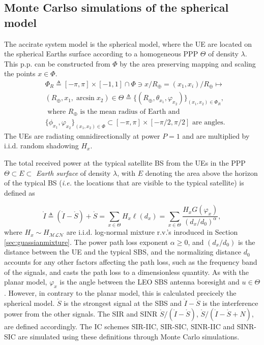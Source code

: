 \documentclass[lettersize,journal]{IEEEtran}
\newcommand{\rEarth}{R_{\oplus}}
\begin{document}
\subsection{Monte Carlso simulations of the spherical model}
\label{sec:sphericalmodel}
The accirate system model is the spherical model, where the UE are located on the spherical Earths surface according to a homogeneous PPP $\Theta$ of density $\lambda$. This p.p. can be constructed from $\Phi$ by the area preserving mapping and scaling the points $x \in \Phi$.
\begin{align}
  &\Phi_R\triangleq[-\pi,\pi]\times[-1,1]\cap\Phi\ni x/\rEarth=(x_1,x_i)/\rEarth\mapsto \nonumber\\
  &(\rEarth,x_1,\arcsin x_2)\in \Theta \triangleq\{(\rEarth,\theta_{x_1},\varphi_{x_2})\}_{(x_1,x_2) \in \Phi_R},  \nonumber \\
  &\text{ where } \rEarth\text{ is the mean radius of Earth and } \nonumber\\
 &\{\phi_{x_1}, \varphi_{x_2}\}_{(x_1,x_2) \in \Phi} \subset [-\pi,\pi] \times [-\pi/2,\pi/2]\text{ are angles}.
\end{align}
The UEs are radiating omnidirectionally at power $P=1$ and are multiplied by i.i.d. random shadowing $H_x$.

The total received power at the typical satellite BS from the UEs in the PPP $\Theta \subset E \subset$ \textit{Earth surface} of density $\lambda$, with $E$ denoting the area above the horizon of the typical BS (\textit{i.e.} the locations that are visible to the typical satellite) is defined as

\begin{equation}
  \label{eq:mathringptot}
  \mathring{I} \triangleq (\mathring{I}- \mathring{S}) + \mathring{S} =    \sum_{x \in \Theta} H_x\ell(d_x) = \sum_{x \in \Theta}  \frac{H_x G(\varphi_x)}{(d_x/d_0)^{\alpha}},
\end{equation}
where $H_{x} \sim H_{\mathcal{M}\mathcal{L}\mathcal{N}}$ are i.i.d. log-normal mixture r.v.'s inroduced in Section \ref{sec:guassianmixture}. The power path loss exponent $\alpha \geq 0$, and $(d_x/d_0)$ is the distance between the UE and the typical SBS, and the normalizing distance $d_0$ accounts for any other factors affecting the path loss, such as the frequency band of the signals, and casts the path loss to a dimensionless quantity.  As with the planar model, $\varphi_x$ is the angle between the LEO SBS antenna boresight and  $u \in \Theta$. However, in contrary to the planar model, this is calculated precicely the spherical model. $\mathring{S}$ is the strongest signal at the SBS and $\mathring{I}-\mathring{S}$ is the interference power from the other signals. The SIR and SINR $\mathring{S}/(\mathring{I}-\mathring{S})$,  $\mathring{S}/(\mathring{I}-\mathring{S}+N)$, are defined accordingly. The IC schemes SIR-IIC, SIR-SIC, SINR-IIC and SINR-SIC are simulated using these definitions through Monte Carlo simulations. 
\end{document}
